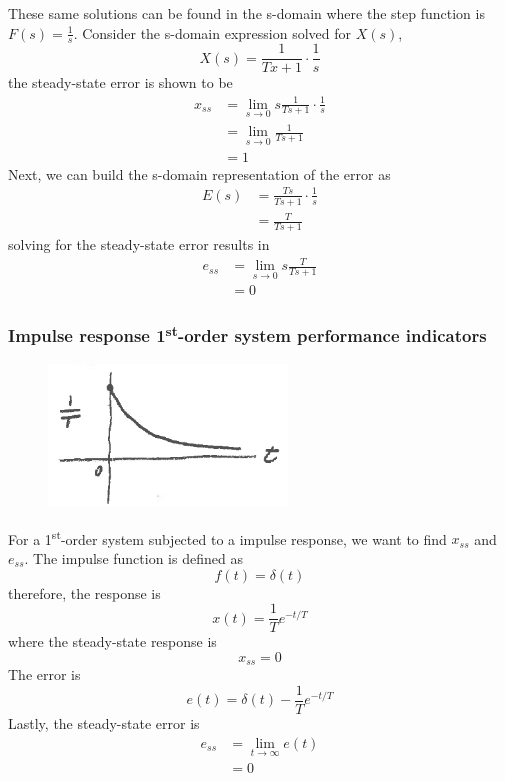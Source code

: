 \documentclass[12pt,letter]{article}
\numberwithin{ex}{section} %
\numberwithin{re}{section} %
\numberwithin{equation}{section}	%
\begin{document}
These same solutions can be found in the s-domain where the step function is $F(s)=\frac{1}{s}$. Consider the s-domain expression solved for $X(s)$, 
\begin{equation}
X(s) = \frac{1}{Tx +1} \cdot \frac{1}{s} 
\end{equation}
the steady-state error is shown to be
\begin{align}
x_{ss} &= \lim\limits_{s \rightarrow 0} s \frac{1}{Ts+1} \cdot \frac{1}{s} \\
&= \lim\limits_{s \rightarrow 0} \frac{1}{Ts+1}   \nonumber \\
&= 1    \nonumber 
\end{align}
Next, we can build the s-domain representation of the error as
\begin{align}
E(s) &= \frac{Ts}{Ts +1} \cdot \frac{1}{s} \\
&= \frac{T}{Ts +1}  \nonumber 
\end{align}
solving for the steady-state error results in
\begin{align}
e_{ss} &= \lim\limits_{s \rightarrow 0}  s \frac{T}{Ts+1} \\
&= 0   \nonumber 
\end{align}

\subsubsection{Impulse response 1\textsuperscript{st}-order system performance indicators}

\begin{figure}[H]
	\centering
	\includegraphics[width=2.5in]{../figures/impulse_response_with_steady_state_error}
\end{figure}



For a 1\textsuperscript{st}-order system subjected to a impulse response, we want to find $x_{ss}$ and $e_{ss}$. The impulse function is defined as
\begin{equation}
f(t) = \delta(t)
\end{equation}
therefore, the response is
\begin{equation}
x(t) =\frac{1}{T} e^{-t/T}
\end{equation}
where the steady-state response is
\begin{equation}
x_{ss} = 0
\end{equation}
The error is
\begin{equation}
e(t) = \delta(t) - \frac{1}{T} e^{-t/T}
\end{equation}
Lastly, the steady-state error is
\begin{align}
e_{ss} &= \lim\limits_{t \rightarrow \infty}e(t) \\
&= 0 \nonumber
\end{align}
\end{document}

